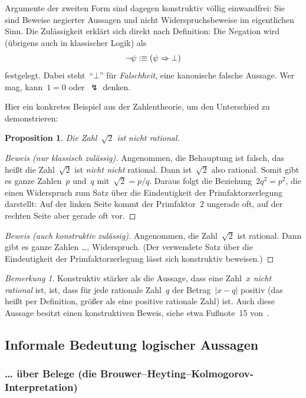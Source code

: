 \documentclass[a4paper,ngerman,12pt]{scrartcl}
\theoremstyle{definition}
\theoremstyle{plain}
\newtheorem{prop}[defn]{Proposition}
\theoremstyle{remark}
\newtheorem{bem}[defn]{Bemerkung}
\renewcommand{\_}{\mathpunct{.}\,}
\newcommand{\?}{\,{:}\,}
\newcommand{\defequiv}{\vcentcolon\equiv}
\begin{document}
Argumente der zweiten Form sind dagegen konstruktiv völlig einwandfrei: Sie
sind Beweise negierter Aussagen und nicht Widerspruchsbeweise im eigentlichen
Sinn. Die Zulässigkeit erklärt sich direkt nach Definition:
Die Negation wird (übrigens auch in klassischer Logik) als
\[ \neg\psi \defequiv (\psi \Rightarrow \bot) \]
festgelegt. Dabei steht~"`$\bot$"' für \emph{Falschheit}, eine kanonische falsche
Aussage. Wer mag, kann~$1 = 0$ oder~$\lightning$ denken.

Hier ein konkretes Beispiel aus der Zahlentheorie, um den Unterschied zu
demonstrieren:
\begin{prop}Die Zahl~$\sqrt{2}$ ist nicht rational.\end{prop}
\begin{proof}[Beweis (nur klassisch zulässig)]
Angenommen, die Behauptung ist falsch, das heißt die Zahl~$\sqrt{2}$ ist \emph{nicht
nicht} rational. Dann ist~$\sqrt{2}$ also rational. Somit gibt es ganze
Zahlen~$p$ und~$q$ mit~$\sqrt{2} = p / q$. Daraus folgt die Beziehung~$2q^2 =
p^2$, die einen Widerspruch zum Satz über die Eindeutigkeit der
Primfaktorzerlegung darstellt: Auf der linken Seite kommt der Primfaktor~$2$
ungerade oft, auf der rechten Seite aber gerade oft vor.
\end{proof}
\begin{proof}[Beweis (auch konstruktiv zulässig)]
Angenommen, die Zahl~$\sqrt{2}$ ist rational. Dann gibt es ganze Zahlen \ldots,
Widerspruch. (Der verwendete Satz über die Eindeutigkeit der
Primfaktorzerlegung lässt sich konstruktiv beweisen.)
\end{proof}

\begin{bem}Konstruktiv stärker als die Aussage, dass eine Zahl~$x$ \emph{nicht
rational} ist, ist, dass für jede rationale Zahl~$q$ der Betrag~$|x-q|$ positiv
(das heißt per Definition, größer als eine positive rationale Zahl) ist. Auch
diese Aussage besitzt einen konstruktiven Beweis, siehe etwa Fußnote~15
von~\cite{katz:meaning}.\end{bem}


\subsection{Informale Bedeutung logischer Aussagen}

\subsubsection*{\ldots{} über Belege (die
Brouwer--Heyting--Kolmogorov-Interpretation)}
\end{document}
